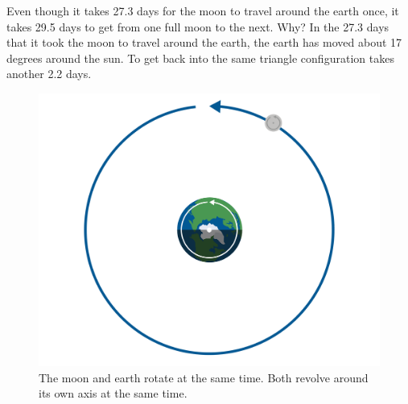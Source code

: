Even though it takes 27.3 days for the moon to travel around the earth once, it takes 29.5 days to get from one full moon to the next. Why?  In the 27.3 days that it took the moon to travel around the earth,  the earth has moved about 17 degrees around the sun.  To get back into the same triangle configuration takes another 2.2 days.
\begin{figure}[htbp]
    \centering
    \includegraphics[width=.7\textwidth]{earthmoon.png}
    \caption{The moon and earth rotate at the same time. Both revolve around its own axis at the same time.}
    \label{fig:earthmoon}
\end{figure}

